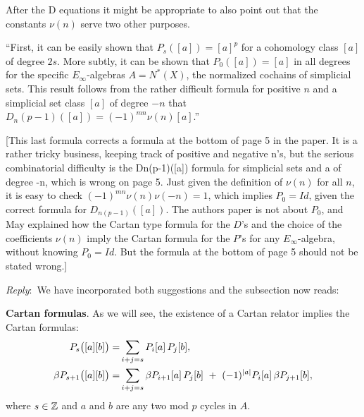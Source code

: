 \documentclass{amsart}
\newcommand{\ar}{\medskip\noindent\textit{Reply}:\ }
\begin{document}
\begin{enumerate}
	\medskip\noindent After the D equations it might be appropriate to also point out that the constants $\nu(n)$ serve two other purposes.

	\medskip\noindent “First, it can be easily shown that $P_s([a]) = [a]^p$ for a cohomology class $[a]$ of degree $2s$.
	More subtly, it can be shown that $P_0([a]) = [a]$ in all degrees for the specific $E_\infty$-algebras $A = N^*(X)$, the normalized cochains of simplicial sets.
	This result follows from the rather difficult formula for positive $n$ and a simplicial set class $[a]$ of degree $-n$ that $D_n(p-1)([a]) = (-1)^{mn} \nu(n)[a]$.”

	[This last formula corrects a formula at the bottom of page 5 in the paper.
	It is a rather tricky business, keeping track of positive and negative n’s, but the serious combinatorial difficulty is the Dn(p-1)([a]) formula for simplicial sets and a of degree -n, which is wrong on page 5.
	Just given the definition of $\nu(n)$ for all $n$, it is easy to check $(-1)^{mn} \nu(n)\nu(-n) = 1$, which implies $P_0 = Id$, given the correct formula for $D_{n(p-1)}([a])$.
	The authors paper is not about $P_0$, and May explained how the Cartan type formula for the $D$’s and the choice of the coefficients $\nu(n)$ imply the Cartan formula for the $P$’s for any $E_\infty$-algebra, without knowing $P_0 = Id$.
	But the formula at the bottom of page 5 should not be stated wrong.]

	\ar We have incorporated both suggestions and the subsection now reads:

	\medskip\noindent\textbf{Cartan formulas}.
	As we will see, the existence of a Cartan relator implies the Cartan formulas:
	\begin{align*}
		P_{s}\big([a][b]\big) =&
		\sum_{i+j=s} P_i[a] \, P_j[b], \\
		\beta P_{s+1}\big([a][b]\big) =&
		\sum_{i+j=s} \beta P_{i+1}[a] \, P_j[b] \ +\ (-1)^{\lvert a\rvert} P_i[a] \, \beta P_{j+1}[b],
	\end{align*}
	where $s \in \mathbb{Z}$ and $a$ and $b$ are any two mod $p$ cycles in $A$.


\end{enumerate}
\end{document}
